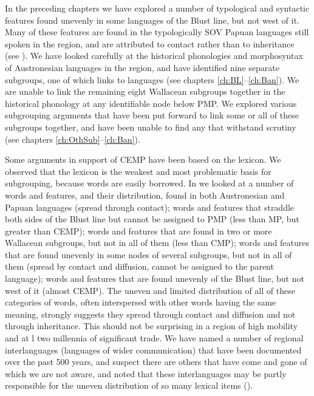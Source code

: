 In the preceding chapters we have explored a number of typological
and syntactic features found unevenly in some languages 
of the Blust line,
but not west of it.
Many of these features are found in the typologically SOV Papuan
languages still spoken in the region,
and are attributed to contact rather than to inheritance (see ).
We have looked carefully at the historical phonologies
and morphosyntax of Austronesian languages in the region,
and have identified nine separate subgroups,
one of which links to  languages (see chapters \ref{ch:BL}--\ref{ch:Ban}).
We are unable to link the remaining eight Wallacean subgroups
together in the historical phonology at any identifiable node below PMP.
We explored various subgrouping arguments that have been put
forward to link some or all of these subgroups together,
and have been unable to find any that withstand scrutiny (see chapters \ref{ch:OthSub}--\ref{ch:Ban}).

Some arguments in support of CEMP have been based on the lexicon.
We observed that the lexicon is the weakest
and most problematic basis for subgrouping,
because words are easily borrowed.
In  we looked at a number of words
and features, and their distribution, found in both Austronesian
and Papuan languages (spread through contact); words
and features that straddle both sides of the Blust line but cannot
be assigned to PMP (less than MP,
but greater than CEMP); words
and features that are found in two or more Wallacean subgroups,
but not in all of them (less than CMP); words
and features that are found unevenly in some nodes of several
subgroups, but not in all of them (spread by contact
and diffusion, cannot be assigned to the parent language); words
and features that are found unevenly  of the Blust line,
but not west of it (almost CEMP).
The uneven and limited distribution of all of these categories
of words, often interspersed with other words having the same meaning,
strongly suggests they spread through contact
and diffusion and not through inheritance.
This should not be surprising in a region of high mobility
and at l two millennia of significant trade.
We have named a number of regional interlanguages (languages
of wider communication) that have been documented over the past
500 years, and suspect there are others that have come
and gone of which we are not aware,
and noted that these interlanguages may be partly responsible
for the uneven distribution of so many lexical items ().

